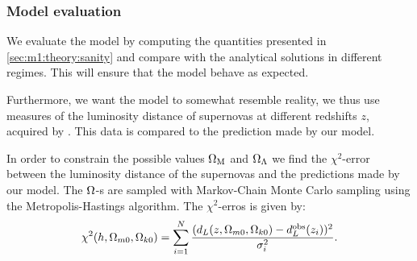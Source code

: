 \subsubsection{Model evaluation}
    We evaluate the model by computing the quantities presented in \cref{sec:m1:theory:sanity} and compare with the analytical solutions in different regimes. This will ensure that the model behave as expected.

    Furthermore, we want the model to somewhat resemble reality, we thus use measures of the luminosity distance of supernovas at different redshifts $z$, acquired by \cite{Betoule_2014}. This data is compared to the prediction made by our model. 

    
    In order to constrain the possible values $\Omega_\mathrm{M}$ and $\Omega_\Lambda$ we find the $\chi^2$-error between the luminosity distance of the supernovas and the predictions made by our model. The $\Omega$-s are sampled with Markov-Chain Monte Carlo sampling using the Metropolis-Hastings algorithm. The $\chi^2$-erros is given by:
    \begin{equation}\label{eq:m1:chi2_test_def}
        \chi^2(h, \Omega_{m0}, \Omega_{k0}) = \sum_{i=1}^N \frac{(d_L(z, \Omega_{m0}, \Omega_{k0}) - d_L^\mathrm{obs}(z_i))^2}{\sigma_i^2}.
    \end{equation}


    